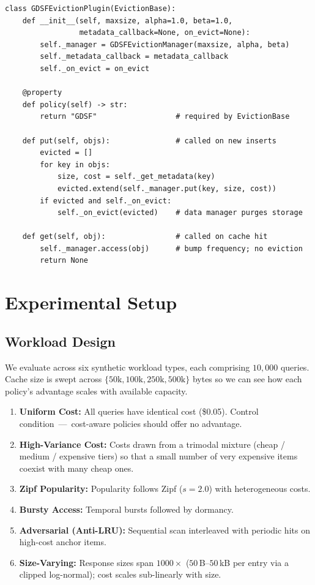 \documentclass[sigconf, nonacm, review=false, screen=true]{acmart}
\begin{document}
\begin{lstlisting}[caption={GDSF plugin for GPTCache (excerpt from \texttt{src/cost\_aware\_eviction/gptcache\_plugin.py}).}, label=lst:gdsf-python]
class GDSFEvictionPlugin(EvictionBase):
    def __init__(self, maxsize, alpha=1.0, beta=1.0,
                 metadata_callback=None, on_evict=None):
        self._manager = GDSFEvictionManager(maxsize, alpha, beta)
        self._metadata_callback = metadata_callback
        self._on_evict = on_evict

    @property
    def policy(self) -> str:
        return "GDSF"                  # required by EvictionBase

    def put(self, objs):               # called on new inserts
        evicted = []
        for key in objs:
            size, cost = self._get_metadata(key)
            evicted.extend(self._manager.put(key, size, cost))
        if evicted and self._on_evict:
            self._on_evict(evicted)    # data manager purges storage

    def get(self, obj):                # called on cache hit
        self._manager.access(obj)      # bump frequency; no eviction
        return None
\end{lstlisting}

\section{Experimental Setup}
\label{sec:setup}

\subsection{Workload Design}
We evaluate across six synthetic workload types, each comprising
$10{,}000$ queries. Cache size is swept across $\{50\text{k}, 100\text{k},
250\text{k}, 500\text{k}\}$ bytes so we can see how each policy's
advantage scales with available capacity.
\begin{enumerate}[leftmargin=1.4em]
  \item \textbf{Uniform Cost:} All queries have identical cost (\$0.05).
        Control condition~---~cost-aware policies should offer no
        advantage.
  \item \textbf{High-Variance Cost:} Costs drawn from a trimodal mixture
        (cheap / medium / expensive tiers) so that a small number of
        very expensive items coexist with many cheap ones.
  \item \textbf{Zipf Popularity:} Popularity follows Zipf ($s=2.0$) with
        heterogeneous costs.
  \item \textbf{Bursty Access:} Temporal bursts followed by dormancy.
  \item \textbf{Adversarial (Anti-LRU):} Sequential scan interleaved with
        periodic hits on high-cost anchor items.
  \item \textbf{Size-Varying:} Response sizes span $1000\times$
        ($50$\,B--$50$\,kB per entry via a clipped log-normal); cost
        scales sub-linearly with size.
\end{enumerate}
\end{document}

